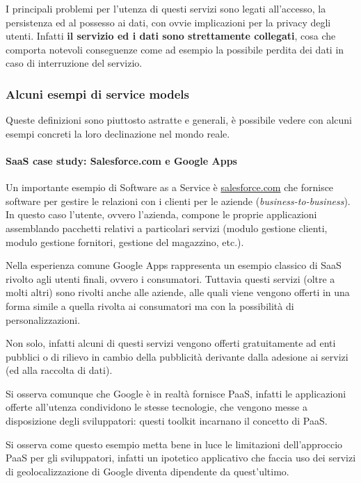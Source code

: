 \documentclass[italian,]{article}
\let\oldparagraph\paragraph
\renewcommand{\paragraph}[1]{\oldparagraph{#1}\mbox{}}
\begin{document}
I principali problemi per l'utenza di questi servizi sono legati
all'accesso, la persistenza ed al possesso ai dati, con ovvie
implicazioni per la privacy degli utenti. Infatti \textbf{il servizio ed
i dati sono strettamente collegati}, cosa che comporta notevoli
conseguenze come ad esempio la possibile perdita dei dati in caso di
interruzione del servizio.

\subsubsection{Alcuni esempi di service
models}\label{alcuni-esempi-di-service-models}

Queste definizioni sono piuttosto astratte e generali, è possibile
vedere con alcuni esempi concreti la loro declinazione nel mondo reale.

\paragraph{SaaS case study: Salesforce.com e Google
Apps}\label{saas-case-study-salesforce.com-e-google-apps}

Un importante esempio di Software as a Service è
\href{www.salesforce.com}{salesforce.com} che fornisce software per
gestire le relazioni con i clienti per le aziende
(\emph{business-to-business}). In questo caso l'utente, ovvero
l'azienda, compone le proprie applicazioni assemblando pacchetti
relativi a particolari servizi (modulo gestione clienti, modulo gestione
fornitori, gestione del magazzino, etc.).

Nella esperienza comune Google Apps rappresenta un esempio classico di
SaaS rivolto agli utenti finali, ovvero i consumatori. Tuttavia questi
servizi (oltre a molti altri) sono rivolti anche alle aziende, alle
quali viene vengono offerti in una forma simile a quella rivolta ai
consumatori ma con la possibilità di personalizzazioni.

Non solo, infatti alcuni di questi servizi vengono offerti gratuitamente
ad enti pubblici o di rilievo in cambio della pubblicità derivante dalla
adesione ai servizi (ed alla raccolta di dati).

Si osserva comunque che Google è in realtà fornisce PaaS, infatti le
applicazioni offerte all'utenza condividono le stesse tecnologie, che
vengono messe a disposizione degli sviluppatori: questi toolkit
incarnano il concetto di PaaS.

Si osserva come questo esempio metta bene in luce le limitazioni
dell'approccio PaaS per gli sviluppatori, infatti un ipotetico
applicativo che faccia uso dei servizi di geolocalizzazione di Google
diventa dipendente da quest'ultimo.
\end{document}
